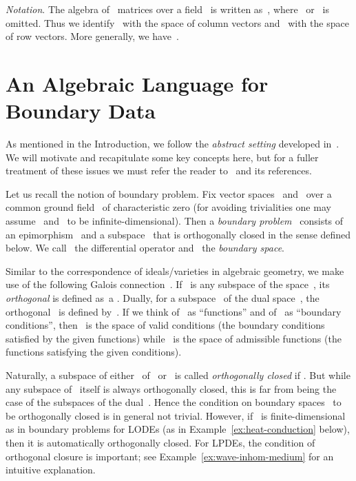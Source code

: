 \documentclass[a4paper]{llncs}
\begin{document}
\emph{Notation}. The algebra of~ matrices over a field~ is
written as~, where~ or~ is omitted. Thus we
identify~ with the space of column vectors
and~ with the space of row vectors. More generally, we
have~.


\section{An Algebraic Language for Boundary Data}
\label{sec:boundary-data}


As mentioned in the Introduction, we follow the \emph{abstract setting}
developed in~\cite{RegensburgerRosenkranz2009}. We will motivate and
recapitulate some key concepts here, but for a fuller treatment of these issues
we must refer the reader to~\cite{RegensburgerRosenkranz2009} and its references.

Let us recall the notion of boundary problem. Fix vector
spaces~ and~ over a common ground field~
of characteristic zero (for avoiding trivialities one may
assume~ and~ to be
infinite-dimensional). Then a \emph{boundary problem}~
consists of an epimorphism~ and a
subspace~ that is orthogonally closed in
the sense defined below. We call~ the differential operator
and~ the \emph{boundary space}.

Similar to the correspondence of ideals/varieties in algebraic geometry, we make
use of the following Galois
connection~\cite[A.11]{RegensburgerRosenkranz2009}. If~ is any
subspace of the space~, its \emph{orthogonal}  is defined as~a
  \in {}. Dually, for a subspace~ of the dual
space~, the orthogonal~ is defined by~\beta \in {}. If we
think of~ as ``functions'' and of~ as ``boundary conditions'',
then~ is the space of valid conditions (the boundary
conditions satisfied by the given functions) while~ is the
space of admissible functions (the functions satisfying the given conditions).

Naturally, a subspace of either~ of~ or~ is called
\emph{orthogonally closed} if . But while
any subspace of~ itself is always orthogonally closed, this is far from
being the case of the subspaces of the dual~. Hence the condition on
boundary spaces~ to be orthogonally closed is in general not
trivial. However, if~ is finite-dimensional as in boundary problems
for LODEs (as in Example~\ref{ex:heat-conduction} below), then it is
automatically orthogonally closed. For LPDEs, the condition of orthogonal
closure is important; see Example~\ref{ex:wave-inhom-medium} for an intuitive
explanation.
\end{document}
